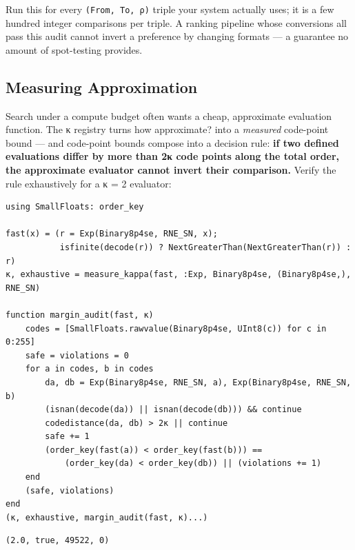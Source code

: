 Run this for every \texttt{(From, To, ρ)} triple your system actually uses; it is a few hundred integer comparisons per triple. A ranking pipeline whose conversions all pass this audit cannot invert a preference by changing formats — a guarantee no amount of spot-testing provides.



\subsection{Measuring Approximation}



\label{13020953006300866863}{}


Search under a compute budget often wants a cheap, approximate evaluation function. The κ registry turns {\textquotedbl}how approximate?{\textquotedbl} into a \emph{measured} code-point bound — and code-point bounds compose into a decision rule: \textbf{if two defined evaluations differ by more than 2κ code points along the total order, the approximate evaluator cannot invert their comparison.} Verify the rule exhaustively for a κ = 2 evaluator:




\nopagebreak[4]
\begin{minipage}{\linewidth}
\begin{verbatim}
using SmallFloats: order_key

fast(x) = (r = Exp(Binary8p4se, RNE_SN, x);
           isfinite(decode(r)) ? NextGreaterThan(NextGreaterThan(r)) : r)
κ, exhaustive = measure_kappa(fast, :Exp, Binary8p4se, (Binary8p4se,), RNE_SN)

function margin_audit(fast, κ)
    codes = [SmallFloats.rawvalue(Binary8p4se, UInt8(c)) for c in 0:255]
    safe = violations = 0
    for a in codes, b in codes
        da, db = Exp(Binary8p4se, RNE_SN, a), Exp(Binary8p4se, RNE_SN, b)
        (isnan(decode(da)) || isnan(decode(db))) && continue
        codedistance(da, db) > 2κ || continue
        safe += 1
        (order_key(fast(a)) < order_key(fast(b))) ==
            (order_key(da) < order_key(db)) || (violations += 1)
    end
    (safe, violations)
end
(κ, exhaustive, margin_audit(fast, κ)...)
\end{verbatim}




\begin{verbatim}
(2.0, true, 49522, 0)
\end{verbatim}
\end{minipage}




